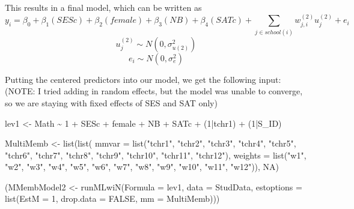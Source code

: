 \documentclass[
]{book}
\newenvironment{Shaded}{\begin{snugshade}}{\end{snugshade}}
\newcommand{\AttributeTok}[1]{\textcolor[rgb]{0.77,0.63,0.00}{#1}}
\newcommand{\ConstantTok}[1]{\textcolor[rgb]{0.00,0.00,0.00}{#1}}
\newcommand{\DecValTok}[1]{\textcolor[rgb]{0.00,0.00,0.81}{#1}}
\newcommand{\FunctionTok}[1]{\textcolor[rgb]{0.00,0.00,0.00}{#1}}
\newcommand{\NormalTok}[1]{#1}
\newcommand{\OtherTok}[1]{\textcolor[rgb]{0.56,0.35,0.01}{#1}}
\newcommand{\SpecialCharTok}[1]{\textcolor[rgb]{0.00,0.00,0.00}{#1}}
\newcommand{\StringTok}[1]{\textcolor[rgb]{0.31,0.60,0.02}{#1}}
\begin{document}
This results in a final model, which can be written as
\[y_{i} = \beta_{0} + \beta_{1}(SESc) + \beta_{2}(female) + \beta_{3}(NB) + \beta_{4}(SATc) + \sum_{j \in school(i)}w_{j,i}^{(2)}u_{j}^{(2)} + e_{i}\]
\[u_{j}^{(2)} \sim N(0, \sigma_{u(2)}^{2})\]
\[e_{i} \sim N(0, \sigma_{e}^{2})\]

Putting the centered predictors into our model, we get the following input: (NOTE: I tried adding in random effects, but the model was unable to converge, so we are staying with fixed effects of SES and SAT only)

\begin{Shaded}
\begin{Highlighting}[]
\NormalTok{lev1 }\OtherTok{\textless{}{-}}\NormalTok{ Math }\SpecialCharTok{\textasciitilde{}} \DecValTok{1} \SpecialCharTok{+}\NormalTok{ SESc }\SpecialCharTok{+}\NormalTok{ female }\SpecialCharTok{+}\NormalTok{ NB }\SpecialCharTok{+}\NormalTok{ SATc }\SpecialCharTok{+}\NormalTok{ (}\DecValTok{1}\SpecialCharTok{|}\NormalTok{tchr1) }\SpecialCharTok{+}\NormalTok{ (}\DecValTok{1}\SpecialCharTok{|}\NormalTok{S\_ID)}

\NormalTok{MultiMemb }\OtherTok{\textless{}{-}} \FunctionTok{list}\NormalTok{(}\FunctionTok{list}\NormalTok{(}
  \AttributeTok{mmvar =} \FunctionTok{list}\NormalTok{(}\StringTok{"tchr1"}\NormalTok{, }\StringTok{"tchr2"}\NormalTok{, }\StringTok{"tchr3"}\NormalTok{, }\StringTok{"tchr4"}\NormalTok{, }\StringTok{"tchr5"}\NormalTok{, }\StringTok{"tchr6"}\NormalTok{, }\StringTok{"tchr7"}\NormalTok{, }\StringTok{"tchr8"}\NormalTok{, }\StringTok{"tchr9"}\NormalTok{, }\StringTok{"tchr10"}\NormalTok{, }\StringTok{"tchr11"}\NormalTok{, }\StringTok{"tchr12"}\NormalTok{),}
  \AttributeTok{weights =} \FunctionTok{list}\NormalTok{(}\StringTok{"w1"}\NormalTok{, }\StringTok{"w2"}\NormalTok{, }\StringTok{"w3"}\NormalTok{, }\StringTok{"w4"}\NormalTok{, }\StringTok{"w5"}\NormalTok{, }\StringTok{"w6"}\NormalTok{, }\StringTok{"w7"}\NormalTok{, }\StringTok{"w8"}\NormalTok{, }\StringTok{"w9"}\NormalTok{, }\StringTok{"w10"}\NormalTok{, }\StringTok{"w11"}\NormalTok{, }\StringTok{"w12"}\NormalTok{)), }\ConstantTok{NA}\NormalTok{)}

\NormalTok{(MMembModel2 }\OtherTok{\textless{}{-}} \FunctionTok{runMLwiN}\NormalTok{(}\AttributeTok{Formula =}\NormalTok{ lev1, }\AttributeTok{data =}\NormalTok{ StudData, }\AttributeTok{estoptions =} \FunctionTok{list}\NormalTok{(}\AttributeTok{EstM =} \DecValTok{1}\NormalTok{, }\AttributeTok{drop.data =} \ConstantTok{FALSE}\NormalTok{, }\AttributeTok{mm =}\NormalTok{ MultiMemb)))}
\end{Highlighting}
\end{Shaded}
\end{document}
